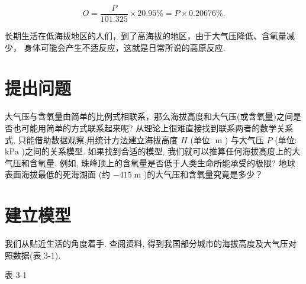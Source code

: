 \documentclass[10pt]{article}
\newcommand*\circled[1]{\tikz[baseline=(char.base)]{\node[shape=circle,draw,inner sep=1.5pt] (char) {\small #1};}}
\begin{document}
\[
O = \frac{P}{101.325} \times  {20.95}\%  = P \times  {0.20676}\% .
\]
  \circled{1} 

长期生活在低海拔地区的人们，到了高海拔的地区，由于大气压降低、含氧量减少， 身体可能会产生不适反应，这就是日常所说的高原反应.

\section*{提出问题}

大气压与含氧量由简单的比例式相联系，那么海拔高度和大气压(或含氧量)之间是否也可能用简单的方式联系起来呢? 从理论上很难直接找到联系两者的数学关系式, 只能借助数据观察,用统计方法建立海拔高度 \(H\) (单位: \(\mathrm{m}\) ) 与大气压 \(P\) (单位: \(\mathrm{{kPa}}\) )之间的关系模型. 如果找到合适的模型, 我们就可以推算任何海拔高度上的大气压和含氧量. 例如, 珠峰顶上的含氧量是否低于人类生命所能承受的极限? 地球表面海拔最低的死海湖面 (约 \(- {415}\mathrm{\;m}\) )的大气压和含氧量究竟是多少？

\section*{建立模型}

我们从贴近生活的角度着手. 查阅资料, 得到我国部分城市的海拔高度及大气压对照数据(表 3-1).

表 3-1
\end{document}
